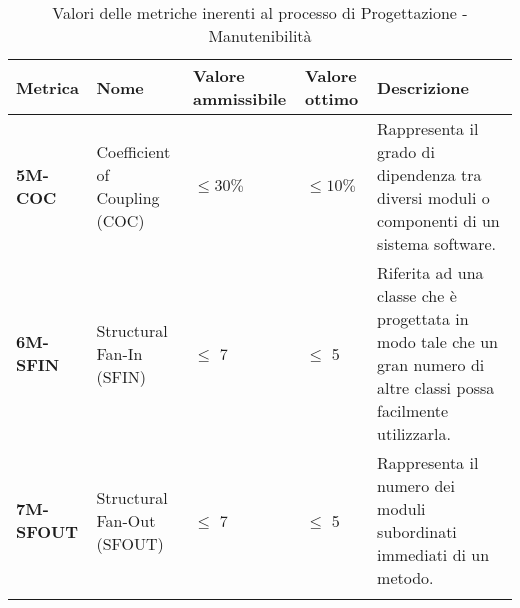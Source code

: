 \begin{longtable}{|>{\centering\arraybackslash}p{}|>{\centering\arraybackslash}p{}|>{\centering\arraybackslash}p{}|>{\centering\arraybackslash}p{}|>{\centering\arraybackslash}p{}|}
	\hline
	\textbf{Metrica}  & \textbf{Nome}                 & \textbf{Valore ammissibile} & \textbf{Valore ottimo} & \textbf{Descrizione}                                                                                                  \\
	\hline
	\endfirsthead
	\hline
	\textbf{5M-COC}   & Coefficient of Coupling (COC) & $\leq 30\% $                & $\leq 10\% $           & Rappresenta il grado di dipendenza tra diversi moduli o componenti di un sistema software.                            \\
	\hline
	\textbf{6M-SFIN}  & Structural Fan-In (SFIN)      & $\leq$ 7                    & $\le$ 5                & Riferita ad una classe che è progettata in modo tale che un gran numero di altre classi possa facilmente utilizzarla. \\
	\hline
	\textbf{7M-SFOUT} & Structural Fan-Out (SFOUT)    & $\leq$ 7                    & $\le$ 5                & Rappresenta il numero dei moduli subordinati immediati di un metodo.                                                  \\
	\hline
	\caption{Valori delle metriche inerenti al processo di Progettazione - Manutenibilità}
	\label{table:3}
\end{longtable}

